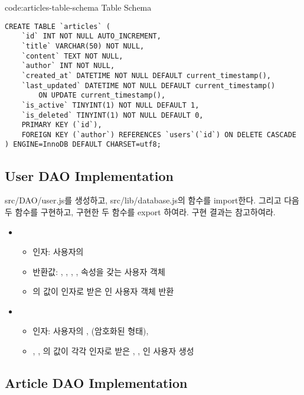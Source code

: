 \begin{codeenv}{code:articles-table-schema}{ Table Schema}\begin{verbatim}
CREATE TABLE `articles` (
    `id` INT NOT NULL AUTO_INCREMENT,
    `title` VARCHAR(50) NOT NULL,
    `content` TEXT NOT NULL,
    `author` INT NOT NULL,
    `created_at` DATETIME NOT NULL DEFAULT current_timestamp(),
    `last_updated` DATETIME NOT NULL DEFAULT current_timestamp()
        ON UPDATE current_timestamp(),
    `is_active` TINYINT(1) NOT NULL DEFAULT 1,
    `is_deleted` TINYINT(1) NOT NULL DEFAULT 0,
    PRIMARY KEY (`id`),
    FOREIGN KEY (`author`) REFERENCES `users`(`id`) ON DELETE CASCADE
) ENGINE=InnoDB DEFAULT CHARSET=utf8;
\end{verbatim}
\end{codeenv}

\subsection*{User DAO Implementation}

src/DAO/user.js를 생성하고, src/lib/database.js의  함수를 import한다. 그리고 다음 두 함수를 구현하고, 구현한 두 함수를 export 하여라. 구현 결과는 \를 참고하여라.

\begin{itemize}
    \item {}
    \begin{itemize}
        \item 인자: 사용자의 
        \item 반환값: , , , ,  속성을 갖는 사용자 객체
        \item {}의 값이 인자로 받은 인 사용자 객체 반환
    \end{itemize}
    \item {}
    \begin{itemize}
        \item 인자: 사용자의 ,  (암호화된 형태), 
        \item {}, , 의 값이 각각 인자로 받은 , , 인 사용자 생성
    \end{itemize}
\end{itemize}

\subsection*{Article DAO Implementation}

